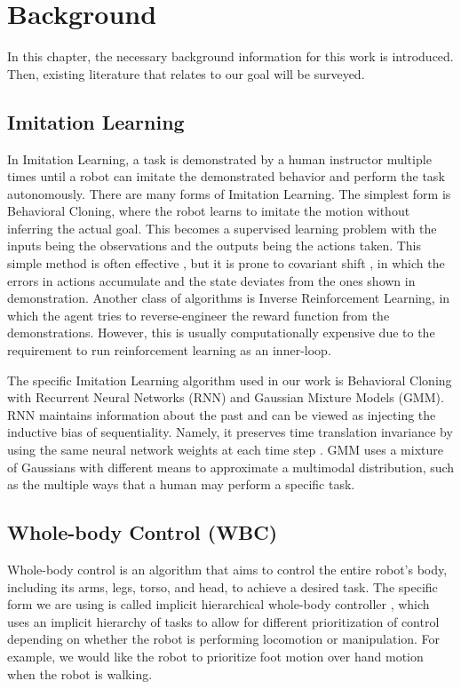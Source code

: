 \chapter{Background}

In this chapter, the necessary background information for this work is introduced. Then, existing literature that relates to our goal will be surveyed.

\section{Imitation Learning}

In Imitation Learning, a task is demonstrated by a human instructor multiple times until a robot can imitate the demonstrated behavior and perform the task autonomously. 
There are many forms of Imitation Learning.
The simplest form is Behavioral Cloning, where the robot learns to imitate the motion without inferring the actual goal. This becomes a supervised learning problem with the inputs being the observations and the outputs being the actions taken. This simple method is often effective \cite{zhang2018deep}, but it is prone to covariant shift \cite{ross2011reduction}, in which the errors in actions accumulate and the state deviates from the ones shown in demonstration. 
Another class of algorithms is Inverse Reinforcement Learning, in which the agent tries to reverse-engineer the reward function from the demonstrations. 
However, this is usually computationally expensive due to the requirement to run reinforcement learning as an inner-loop.

The specific Imitation Learning algorithm used in our work is Behavioral Cloning with Recurrent Neural Networks (RNN) and Gaussian Mixture Models (GMM). RNN maintains information about the past and can be viewed as injecting the inductive bias of sequentiality. Namely, it preserves time translation invariance by using the same neural network weights at each time step \cite{battaglia2018relational}. GMM uses a mixture of Gaussians with different means to approximate a multimodal distribution, such as the multiple ways that a human may perform a specific task.

\section{Whole-body Control (WBC)}

Whole-body control is an algorithm that aims to control the entire robot's body, including its arms, legs, torso, and head, to achieve a desired task.
The specific form we are using is called implicit hierarchical whole-body controller \cite{Ahn2021VersatileLP}, which uses an implicit hierarchy of tasks to allow for different prioritization of control depending on whether the robot is performing locomotion or manipulation. For example, we would like the robot to prioritize foot motion over hand motion when the robot is walking.

